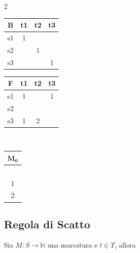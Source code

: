 \begin{multicols}{2}
\begin{center}
	\end{center}
	\columnbreak
	\begin{center}
		\begin{tabular}{|c|c|c|c|}
			\hline
			\textbf{B} & t1 & t2 & t3 \\ \hline
			s1         & 1  &    &    \\ \hline
			s2         &    & 1  &    \\ \hline
			s3         &    &    & 1  \\ \hline
		\end{tabular}
		\hspace{1em}
		\begin{tabular}{|c|c|c|c|}
			\hline
			\textbf{F} & t1 & t2 & t3 \\ \hline
			s1         & 1  &    & 1  \\ \hline
			s2         &    &    &    \\ \hline
			s3         & 1  & 2  &    \\ \hline
		\end{tabular}
		\\
		\vspace{1em}
		\begin{tabular}{|c|}
			\hline
			\textbf{$\mathbf{M_0}$} \\ \hline
			\                       \\ \hline
			1                       \\ \hline
			2                       \\ \hline
		\end{tabular}

	\end{center}
\end{multicols}

\subsection{Regola di Scatto}

Sia $M : S \to \mathbb N$ una marcatura e $t \in T$, allora

